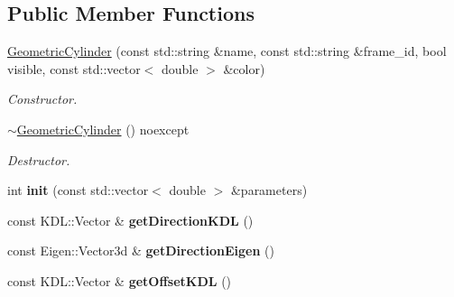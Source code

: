 \subsection*{Public Member Functions}
\begin{DoxyCompactItemize}
\item 
\hypertarget{classhiqp_1_1GeometricCylinder_ae5df348490704c2c488ad9f76a545da6}{\hyperlink{classhiqp_1_1GeometricCylinder_ae5df348490704c2c488ad9f76a545da6}{Geometric\-Cylinder} (const std\-::string \&name, const std\-::string \&frame\-\_\-id, bool visible, const std\-::vector$<$ double $>$ \&color)}\label{classhiqp_1_1GeometricCylinder_ae5df348490704c2c488ad9f76a545da6}

\begin{DoxyCompactList}\small\item\em Constructor. \end{DoxyCompactList}\item 
\hypertarget{classhiqp_1_1GeometricCylinder_acd8880327a84bdeaf6e2f13bad35d57d}{\hyperlink{classhiqp_1_1GeometricCylinder_acd8880327a84bdeaf6e2f13bad35d57d}{$\sim$\-Geometric\-Cylinder} () noexcept}\label{classhiqp_1_1GeometricCylinder_acd8880327a84bdeaf6e2f13bad35d57d}

\begin{DoxyCompactList}\small\item\em Destructor. \end{DoxyCompactList}\item 
\hypertarget{classhiqp_1_1GeometricCylinder_a4e920a23e4701d6db10615370d646bc4}{int {\bfseries init} (const std\-::vector$<$ double $>$ \&parameters)}\label{classhiqp_1_1GeometricCylinder_a4e920a23e4701d6db10615370d646bc4}

\item 
\hypertarget{classhiqp_1_1GeometricCylinder_a12ce94f483097fbd633547621fa2f20c}{const K\-D\-L\-::\-Vector \& {\bfseries get\-Direction\-K\-D\-L} ()}\label{classhiqp_1_1GeometricCylinder_a12ce94f483097fbd633547621fa2f20c}

\item 
\hypertarget{classhiqp_1_1GeometricCylinder_a7b3eacdf69dbb564325f46e17b8ef949}{const Eigen\-::\-Vector3d \& {\bfseries get\-Direction\-Eigen} ()}\label{classhiqp_1_1GeometricCylinder_a7b3eacdf69dbb564325f46e17b8ef949}

\item 
\hypertarget{classhiqp_1_1GeometricCylinder_aa52c4ae8a81cd2666ae071fc78ff464b}{const K\-D\-L\-::\-Vector \& {\bfseries get\-Offset\-K\-D\-L} ()}\label{classhiqp_1_1GeometricCylinder_aa52c4ae8a81cd2666ae071fc78ff464b}


\end{DoxyCompactItemize}
